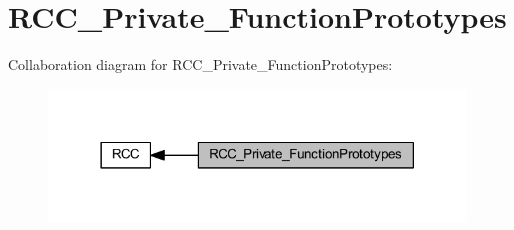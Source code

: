 \hypertarget{group___r_c_c___private___function_prototypes}{}\section{R\+C\+C\+\_\+\+Private\+\_\+\+Function\+Prototypes}
\label{group___r_c_c___private___function_prototypes}
Collaboration diagram for R\+C\+C\+\_\+\+Private\+\_\+\+Function\+Prototypes\+:
\nopagebreak
\begin{figure}[H]
\begin{center}
\leavevmode
\includegraphics[width=314pt]{group___r_c_c___private___function_prototypes}
\end{center}
\end{figure}
